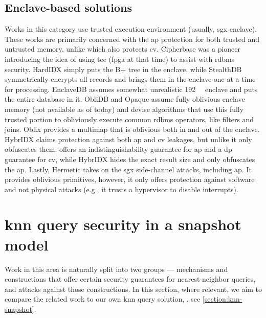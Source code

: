 		\subsection{Enclave-based solutions}

			Works in this category use trusted execution environment (usually, \acrshort{sgx} enclave).
			These works are primarily concerned with the \acrshort{ap} protection for both trusted and untrusted memory, unlike \epsolute{} which also protects \acrshort{cv}.
			Cipherbase \cite{cipherbase-daas} was a pioneer introducing the idea of using \acrshort{tee} (\acrshort{fpga} at that time) to assist with \acrshort{rdbms} security.
			HardIDX \cite{hardidx} simply puts the B+ tree in the enclave, while StealthDB \cite{stealth-db} symmetrically encrypts all records and brings them in the enclave one at a time for processing.
			EnclaveDB \cite{enclave-db} assumes somewhat unrealistic \SI{192}{\giga\byte} enclave and puts the entire database in it.
			ObliDB \cite{oblidb} and Opaque \cite{opaque} assume fully oblivious enclave memory (not available as of today) and devise algorithms that use this fully trusted portion to obliviously execute common \acrshort{rdbms} operators, like filters and joins.
			Oblix \cite{oblix} provides a multimap that is oblivious both in and out of the enclave.
			HybrIDX claims protection against both \acrshort{ap} and \acrshort{cv} leakages, but unlike \epsolute{} it only obfuscates them.
			\epsolute{} offers an indistinguishability guarantee for \acrshort{ap} and a \acrshort{dp} guarantee for \acrshort{cv}, while HybrIDX hides the exact result size and only obfuscates the \acrshort{ap}.
			Lastly, Hermetic \cite{hermetic} takes on the \acrshort{sgx} side-channel attacks, including \acrshort{ap}.
			It provides oblivious primitives, however, it only offers protection against software and not physical attacks (e.g., it trusts a hypervisor to disable interrupts).

	\section{\texorpdfstring{\acrshort{knn}}{kNN} query security in a snapshot model}

		Work in this area is naturally split into two groups --- mechanisms and constructions that offer certain security guarantees for nearest-neighbor queries, and attacks against those constructions.
		In this section, where relevant, we aim to compare the related work to our own \acrshort{knn} query solution, \kanon{} \cite{k-anon}, see \cref{section:knn-snapshot}.

